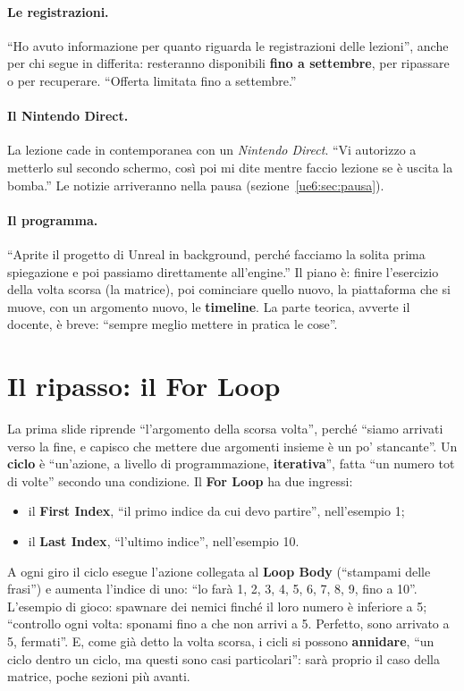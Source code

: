 \paragraph{Le registrazioni.} ``Ho avuto informazione per quanto riguarda le
registrazioni delle lezioni'', anche per chi segue in differita: resteranno disponibili
\textbf{fino a settembre}, per ripassare o per recuperare. ``Offerta limitata fino a
settembre.''

\paragraph{Il Nintendo Direct.} La lezione cade in contemporanea con un \emph{Nintendo
Direct}. ``Vi autorizzo a metterlo sul secondo schermo, così poi mi dite mentre faccio
lezione se è uscita la bomba.'' Le notizie arriveranno nella pausa
(sezione~\ref{ue6:sec:pausa}).

\paragraph{Il programma.} ``Aprite il progetto di Unreal in background, perché facciamo
la solita prima spiegazione e poi passiamo direttamente all'engine.'' Il piano è: finire
l'esercizio della volta scorsa (la matrice), poi cominciare quello nuovo, la
piattaforma che si muove, con un argomento nuovo, le \textbf{timeline}. La parte
teorica, avverte il docente, è breve: ``sempre meglio mettere in pratica le cose''.

\section{Il ripasso: il For Loop}
\label{ue6:sec:forloop}

La prima slide riprende ``l'argomento della scorsa volta'', perché ``siamo arrivati verso
la fine, e capisco che mettere due argomenti insieme è un po' stancante''. Un
\textbf{ciclo} è ``un'azione, a livello di programmazione, \textbf{iterativa}'', fatta
``un numero tot di volte'' secondo una condizione. Il \textbf{For Loop} ha due ingressi:
\begin{itemize}
  \item il \textbf{First Index}, ``il primo indice da cui devo partire'', nell'esempio 1;
  \item il \textbf{Last Index}, ``l'ultimo indice'', nell'esempio 10.
\end{itemize}
A ogni giro il ciclo esegue l'azione collegata al \textbf{Loop Body} (``stampami delle
frasi'') e aumenta l'indice di uno: ``lo farà 1, 2, 3, 4, 5, 6, 7, 8, 9, fino a 10''.
L'esempio di gioco: spawnare dei nemici finché il loro numero è inferiore a 5;
``controllo ogni volta: sponami fino a che non arrivi a 5. Perfetto, sono arrivato a 5,
fermati''. E, come già detto la volta scorsa, i cicli si possono \textbf{annidare}, ``un
ciclo dentro un ciclo, ma questi sono casi particolari'': sarà proprio il caso della
matrice, poche sezioni più avanti.

